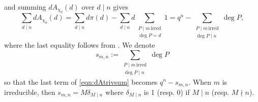 \documentclass[10pt,reqno]{amsproc}
\newcommand{\1}{\mathds{1}}	%
\theoremstyle{definition}
\theoremstyle{remark}
\begin{document}
and summing $d A_{\chi_0}(d)$ over $d \mid n$ gives
\begin{equation}
\label{eqn:dAtrivsum}
    \sum_{d \mid n} dA_{\chi_0}(d) = \sum_{d \mid n} d \pi(d) - \sum_{d \mid n} d\sum_{\substack{P \mid m\,\text{irred} \\ \deg P = d}} 1 = q^n - \sum_{\substack{P \mid m\,\text{irred} \\ \deg P \mid n}} \deg P,
\end{equation}
where the last equality follows from \cite[Proposition 2.1]{rosen2013number}.
We denote
\begin{equation}
\label{eqn:sm}
    s_{m,n} := \sum_{\substack{P \mid m\,\text{irred} \\ \deg P \mid n}} \deg P
\end{equation}
so that the last term of \eqref{eqn:dAtrivsum} becomes $q^n - s_{m, n}$.
When $m$ is irreducible, then $s_{m, n} = M \delta_{M \mid n}$ where $\delta_{M \mid n}$ is 1 (resp. 0) if $M \mid n$ (resp. $M \nmid n$).
\end{document}

